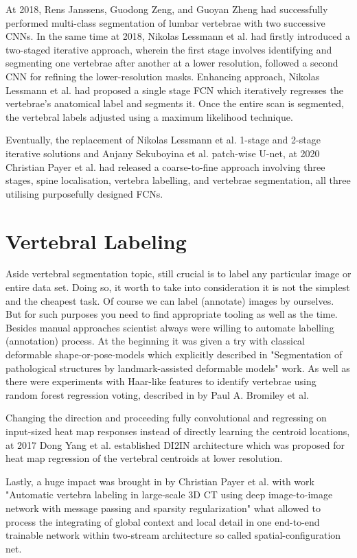 At 2018, Rens Janssens, Guodong Zeng, and Guoyan Zheng \cite{Janssens2018} had successfully performed multi-class segmentation of lumbar vertebrae with two successive CNNs. In the same time at 2018, Nikolas Lessmann et al. \cite{Lessmann2019} had firstly introduced a two-staged iterative approach, wherein the first stage involves identifying and segmenting one vertebrae after another at a lower resolution, followed a second CNN for refining the lower-resolution masks. Enhancing approach, Nikolas Lessmann et al. \cite{Lessmann2019} had proposed a single stage FCN which iteratively regresses the vertebrae’s anatomical label and segments it. Once the entire scan is segmented, the vertebral labels adjusted using a maximum likelihood
technique. 

Eventually, the replacement of Nikolas Lessmann et al. 1-stage and 2-stage iterative solutions and Anjany Sekuboyina et al. patch-wise U-net, at 2020 Christian Payer et al. \cite{Payer2020} had released a coarse-to-fine approach involving three stages, spine localisation, vertebra labelling, and vertebrae segmentation, all three utilising purposefully designed FCNs.

\section{Vertebral Labeling}
Aside vertebral segmentation topic, still crucial is to label any particular image or entire data set. Doing so, it worth to take into consideration it is not the simplest and the cheapest task. Of course we can label (annotate) images by ourselves. But for such purposes you need to find appropriate tooling as well as the time. Besides manual approaches scientist always were willing to automate labelling (annotation) process. At the beginning it was given a try with classical deformable shape-or-pose-models which explicitly described in "Segmentation of pathological structures by landmark-assisted deformable models" \cite{Ibragimov2017} work. As well as there were experiments with Haar-like features to identify vertebrae using random forest regression voting, described in \cite{Bromiley2016} by Paul A. Bromiley et al.

Changing the direction and proceeding fully convolutional and regressing on input-sized heat map responses instead of directly learning the centroid locations, at 2017 Dong Yang et al. established DI2IN architecture \cite{Yang2017} which was proposed for heat map regression of the vertebral centroids at lower resolution. 

Lastly, a huge impact was brought in by Christian Payer et al. with work "Automatic vertebra labeling in large-scale 3D CT using deep image-to-image network with message passing and sparsity regularization" \cite{Payer2019} what allowed to process the integrating of global context and local detail in one end-to-end trainable network within two-stream architecture so called spatial-configuration net. 



